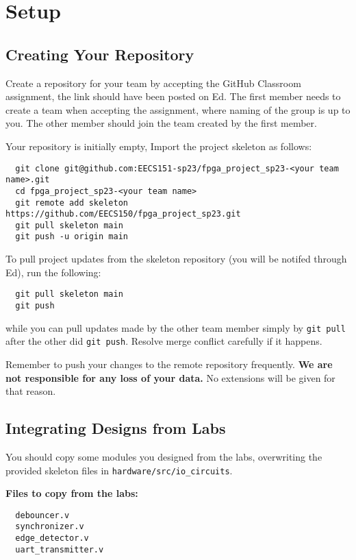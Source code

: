 \section{Setup}

\subsection{Creating Your Repository}
Create a repository for your team by accepting the GitHub Classroom assignment, the link should have been posted on Ed.
The first member needs to create a team when accepting the assignment, where naming of the group is up to you.
The other member should join the team created by the first member.

Your repository is initially empty,
Import the project skeleton as follows:

\begin{verbatim}
  git clone git@github.com:EECS151-sp23/fpga_project_sp23-<your team name>.git
  cd fpga_project_sp23-<your team name>
  git remote add skeleton https://github.com/EECS150/fpga_project_sp23.git
  git pull skeleton main
  git push -u origin main
\end{verbatim}

To pull project updates from the skeleton repository (you will be notifed through Ed), run the following:
\begin{verbatim}
  git pull skeleton main
  git push
\end{verbatim}
while you can pull updates made by the other team member simply by \verb|git pull| after the other did \verb|git push|.
Resolve merge conflict carefully if it happens.

Remember to push your changes to the remote repository frequently.
\textbf{We are not responsible for any loss of your data.}
No extensions will be given for that reason.


\subsection{Integrating Designs from Labs}
You should copy some modules you designed from the labs, overwriting the provided skeleton files in \verb|hardware/src/io_circuits|.

\textbf{Files to copy from the labs:}
\begin{verbatim}
  debouncer.v
  synchronizer.v
  edge_detector.v
  uart_transmitter.v
\end{verbatim}


